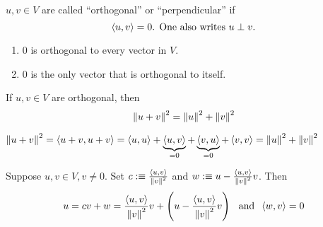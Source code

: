 \setcounter{thm}{9}
\begin{mydef}[orthogonal]
  $u,v \in V$ are called ``orthogonal'' or ``perpendicular'' if 
  \begin{equation}
    \ip{u}{v} =0$. One also writes $u \perp v.
  \end{equation}
\end{mydef}

\begin{thm} 
  \begin{enumerate}[label=(\alph*)]
    \item $0$ is orthogonal to every vector in $V$.
    \item $0$ is the only vector that is orthogonal to itself.
  \end{enumerate}
\end{thm}

\begin{thm}
  If $u,v \in V$ are orthogonal, then
  \begin{equation}
    \left \lVert u+v \right \rVert^2 = \left \lVert u \right \rVert^2 + \left \lVert v \right \rVert^2
  \end{equation}
\end{thm}
\begin{prf} 
  $\left \lVert u+v \right \rVert^2 = \left \langle u+v, u+v \right \rangle = \left \langle u, u \right \rangle + \underbrace{\left \langle u, v \right \rangle}_{=0} + \underbrace{\left \langle v, u \right \rangle}_{=0} + \left \langle v, v \right \rangle = \left \lVert u \right \rVert^2 + \left \lVert v \right \rVert^2 $
\end{prf}

\setcounter{thm}{12}
\begin{thm}
  \label{thm: an orthogonal decomposition}
  Suppose $u,v \in V, v\neq 0.$ Set $c :\equiv \frac{\left \langle u, v \right \rangle}{\left \lVert v \right \rVert^2}$ and $w :\equiv u-\frac{\left \langle u, v \right \rangle}{\left \lVert v \right \rVert^2}v$. Then
  \begin{equation}
    u = cv+w = \frac{\left \langle u, v \right \rangle}{\left \lVert v \right \rVert^2} v + \left( u- \frac{\left \langle u, v \right \rangle}{\left \lVert v \right \rVert^2} v \right  ) \;\;\, \text{and}\;\; \left \langle w, v \right \rangle=0
  \end{equation}
\end{thm}

